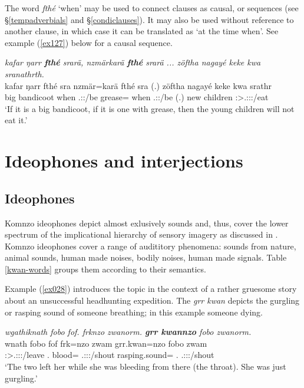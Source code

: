 The word \emph{fthé} `when' may be used to connect clauses as causal,  or  sequences (see \S\ref{tempadverbials} and \S\ref{condiclauses}). It may also be used without reference to another clause, in which case it can be translated as `at the time when'. See example (\ref{ex127}) below for a causal sequence.

\begin{exe}
	\ex \emph{kafar ŋarr \textbf{fthé} srarä, nzmärkarä \textbf{fthé} srarä ... zöftha nagayé keke kwa sranathrth.}\\
	\gll kafar ŋarr fthé sra nzmär=karä fthé sra (.) zöftha nagayé keke kwa srathr\\
	big bandicoot when \Tsg.\Masc:\Irr:\Ipfv/be grease=\Prop{} when \Tsg.\Masc:\Irr:\Ipfv/be (.) new children \Neg{} \Fut{} \Stsg:\Sbj>\Tsg.\Masc:\Obj:\Irr:\Ipfv/eat\\
	\trans `If it is a big bandicoot, if it is one with grease, then the young children will not eat it.' 
	\label{ex127}
\end{exe}

\section{Ideophones and interjections} \label{ideophones-and-interjections}

\subsection{Ideophones} \label{ideophonesec}

Komnzo ideophones depict almost exlusively sounds and, thus, cover the lower spectrum of the implicational hierarchy of sensory imagery as discussed in \citep[663]{Dingemanse:2012fc}. Komnzo ideophones cover a range of audititory phenomena: sounds from nature, animal sounds, human made noises, bodily noises, human made signals. Table \ref{kwan-words} groups them according to their semantics.%

Example (\ref{ex028}) introduces the topic in the context of a rather gruesome story about an unsuccessful headhunting expedition. The  \emph{grr kwan} depicts the gurgling or rasping sound of someone breathing; in this example someone dying.

\begin{exe}
	\ex \emph{wgathiknath fobo fof. frknzo zwanorm. \textbf{grr kwannzo} fobo zwanorm.}\\
	\gll wnath fobo fof frk=nzo zwam grr.kwan=nzo fobo zwam\\
	\Stdu:\Sbj>\Tsg.\F:\Obj:\Pst:\Ipfv/leave \Dist{}.\All{} \Emph{} blood=\Only{} \Tsg.\F:\Sbj:\Pst:\Dur/shout rasping.sound=\Only{} \Dist{}.\All{} \Tsg.\F:\Sbj:\Pst:\Dur/shout\\
	\trans `The two left her while she was bleeding from there (the throat). She was just gurgling.' 
	\label{ex028}
\end{exe}


